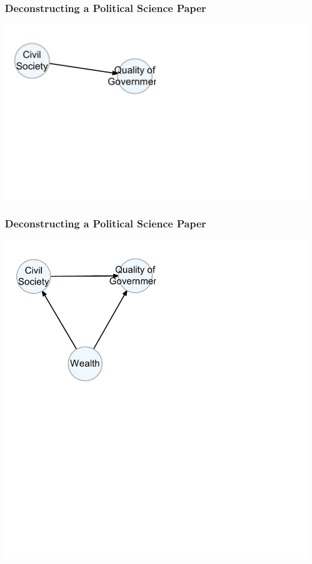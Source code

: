 \documentclass[xcolor=x11names,compress]{beamer}\usepackage[]{graphicx}\usepackage[]{color}
\makeatletter
\def\maxwidth{ %
  \ifdim\Gin@nat@width>\linewidth
    \linewidth
  \else
    \Gin@nat@width
  \fi
}
\newenvironment{knitrout}{}{} %
\renewcommand{\(}{\begin{columns}}
\renewcommand{\)}{\end{columns}}
\newcommand{\<}[1]{\begin{column}{#1}}
\renewcommand{\>}{\end{column}}
\makeatother
\begin{document}
\begin{frame}
\frametitle{Deconstructing a Political Science Paper}
\begin{knitrout}
\color{fgcolor}
\includegraphics[width=\maxwidth]{figure/unnamed-chunk-1-1} 

\end{knitrout}
\end{frame}

\begin{frame}
\frametitle{Deconstructing a Political Science Paper}
\begin{knitrout}
\color{fgcolor}
\includegraphics[width=\maxwidth]{figure/unnamed-chunk-2-1} 

\end{knitrout}
\end{frame}
\end{document}
